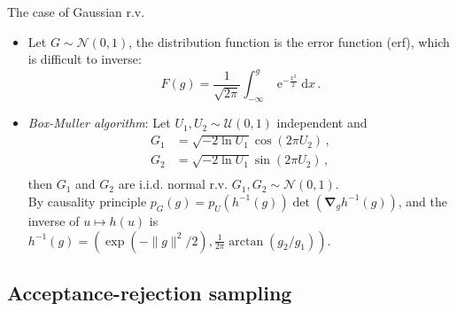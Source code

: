 \documentclass{beamer}
\newcommand{\id}{\mathrm{d}}
\newcommand{\iexp}{\operatorname{e}}
\newcommand{\bnabla}{\boldsymbol\nabla}
\newcommand{\PDFU}{{\mathcal U}}
\newcommand{\PDFN}{{\mathcal N}}
\begin{document}
\begin{frame}{The case of Gaussian r.v.}

\begin{itemize}
\item Let $G\sim\PDFN(0,1)$, the distribution function is the error function (erf), which is difficult to inverse:
\begin{displaymath}
F(g)=\frac{1}{\sqrt{2\pi}}\int_{-\infty}^g\iexp^{-\frac{x^2}{2}}\id x\,.
\end{displaymath}
\vspace{-0.3truecm}
\item \emph{Box-Muller algorithm}: Let $U_1,U_2\sim\PDFU(0,1)$ independent and
\begin{displaymath}
\begin{split}
G_1 &=\sqrt{-2\operatorname{ln}U_1}\cos(2\pi U_2)\,,\\
G_2 &=\sqrt{-2\operatorname{ln}U_1}\sin(2\pi U_2)\,,\\
\end{split}
\end{displaymath}
then $G_1$ and $G_2$ are i.i.d. normal r.v. $G_1,G_2\sim \PDFN(0,1)$.\\
{\footnotesize By causality principle $p_G(g)=p_U(h^{-1}(g))\det(\bnabla_{\!g}h^{-1}(g))$, and
the inverse of $u\mapsto h(u)$ is $h^{-1}(g)=(\exp(-\|g\|^2/2),\frac{1}{2\pi}\arctan(g_2/g_1))$.
}
\end{itemize}

\end{frame}

\subsection{Acceptance-rejection sampling}
\end{document}
